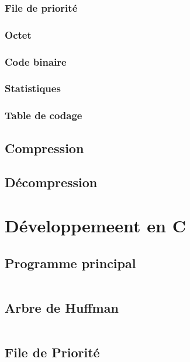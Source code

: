 \documentclass[12pt,a4paper]{article}
\begin{document}
\subsubsection{File de priorité}

\subsubsection{Octet}

\subsubsection{Code binaire}

\subsubsection{Statistiques}

\subsubsection{Table de codage}

\subsection{Compression}

\subsection{Décompression}


\newpage

\section{Développemeent en C}
\subsection{Programme principal}
    \inputminted[breaklines]{c}{../code/src/main.c}
\subsection{Arbre de Huffman}
    \inputminted[breaklines]{c}{../code/src/arbre.c}
\subsection{File de Priorité}
    \inputminted[breaklines]{c}{../code/src/fileDePriorite.c}
\end{document}
